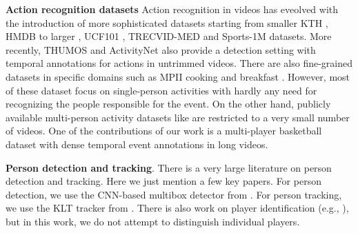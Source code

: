 \noindent \textbf{Action recognition datasets}
Action recognition in videos has eveolved with the introduction of more
sophisticated datasets starting from smaller KTH \cite{KTH}, HMDB \cite{HMDB}
to larger , UCF101 \cite{UCF101}, TRECVID-MED \cite{MED11} and Sports-1M
\cite{Karpathy_CVPR14} datasets.  More recently, THUMOS \cite{THUMOS} and
ActivityNet \cite{ActivityNet} also provide a detection setting with temporal
annotations for actions in untrimmed videos.  There are also fine-grained
datasets in specific domains such as MPII cooking \cite{Finegrained_cooking}
and breakfast \cite{Breakfast}.  However, most of these dataset focus on
single-person activities with hardly any need for recognizing the people
responsible for the event. On the other hand, publicly available multi-person
activity datasets like \cite{Ryoo_10,Choi_ICCV09,VIRAT} are restricted to a very small
number of videos.  One of the contributions of our work is a multi-player
basketball dataset with dense temporal event annotations in long videos.

\noindent \textbf{Person detection and tracking}. There is a very
large literature on person detection and tracking. Here we just
mention a few key papers.
For person detection, we use the CNN-based multibox detector from
\cite{Szegedy13}.
For person tracking, we use the KLT tracker from
\cite{Veenman_PAMI2001}.
There is also work on player identification (e.g., \cite{Lu2013}), but
in this work, we do not attempt to distinguish individual players.
